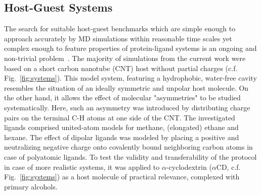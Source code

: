\documentclass[9pt,lessons]{livecoms}
\begin{document}
\subsection{Host-Guest Systems}

The search for suitable host-guest benchmarks which are simple enough to approach accurately by MD simulations within reasonable time scales 
yet complex enough to feature properties of protein-ligand systems is an ongoing and non-trivial problem~\cite{mobley2017predicting}.
The majority of simulations from the current work were based on a short carbon nanotube (CNT) host without partial charges (c.f. Fig.~\ref{fig:systems}).
This model system, featuring a hydrophobic, water-free cavity resembles the situation of an ideally symmetric and unpolar host molecule. 
On the other hand, it allows the effect of molecular "asymmetries" to be studied systematically.
Here, such an asymmetry was introduced by distributing charge pairs on the terminal C-H atoms at one side of the CNT.
The investigated ligands comprised united-atom models for methane, (elongated) ethane and hexane.
The effect of dipolar ligands was modeled by placing a positive and neutralizing negative charge onto covalently bound neighboring carbon atoms in case of polyatomic ligands.
To test the validity and transferability of the protocol in case of more realistic systems, it was applied to $\alpha$-cyclodextrin ($\alpha$CD, c.f. Fig.~\ref{fig:systems}) as a host molecule of practical relevance, complexed with primary alcohols.
\end{document}
